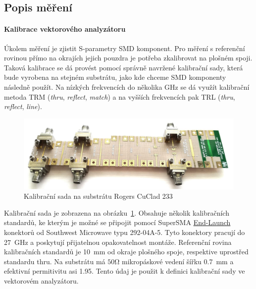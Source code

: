 \documentclass[11pt,a4paper]{article}
\newcommand{\Ohm}{\mathrm{\Omega}}
\begin{document}
\subsection*{Popis měření}

\paragraph*{Kalibrace vektorového analyzátoru} Úkolem měření je zjistit S-parametry SMD komponent. Pro měření s referenční rovinou přímo na okrajích jejich pouzdra je potřeba zkalibrovat na plošném spoji. Taková kalibrace se dá provést pomocí správně navržené kalibrační sady, která bude vyrobena na stejném substrátu, jako kde chceme SMD komponenty následně použít. Na nízkých frekvencích do několika GHz se dá využít kalibrační metoda TRM (\emph{thru}, \emph{reflect}, \emph{match}) a na vyšších frekvencích pak TRL (\emph{thru}, \emph{reflect}, \emph{line}).
\begin{figure}[!ht]
    \centering
    \includegraphics[width=.7\textwidth]{src/kalibracni-sada.png}
    \caption{\label{fig:kalibracni-sada}Kalibrační sada na substrátu Rogers CuClad 233}
\end{figure}

Kalibrační sada je zobrazena na obrázku~\ref{fig:kalibracni-sada}. Obsahuje několik kalibračních standardů, ke kterým je možné se připojit pomocí SuperSMA \href{https://mpd.southwestmicrowave.com/product-category/end-launch-connectors/}{End-Launch} konektorů od Southwest Microwave typu 292-04A-5. Tyto konektory pracují do 27~GHz a poskytují přijatelnou opakovatelnost montáže. Referenční rovina kalibračních standardů je 10~mm od okraje plošného spoje, respektive uprostřed standardu thru. Na substrátu má $50\Ohm$ mikropáskové vedení šířku 0.7~mm a efektivní permitivitu asi 1.95. Tento údaj je použit k definici kalibrační sady ve vektorovém analyzátoru.
\end{document}

